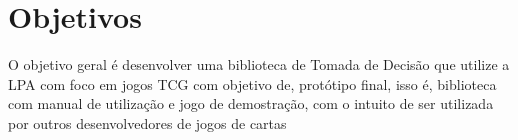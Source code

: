 \section{Objetivos}

O objetivo geral é desenvolver uma biblioteca de Tomada de Decisão que utilize a LPA com foco em jogos TCG com objetivo de, protótipo final, isso é, biblioteca com manual de utilização e jogo de demostração, com o intuito de ser utilizada por outros desenvolvedores de jogos de cartas


